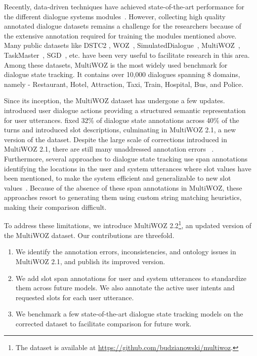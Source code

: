 Recently, data-driven techniques have achieved state-of-the-art performance for the different dialogue systems modules~\cite{Wen_2017, Ren_2018, zhang2019find,chao2019bert}. However, collecting high quality annotated dialogue datasets remains a challenge for the researchers because of the extensive annotation required for training the modules mentioned above. Many public datasets like DSTC2 \cite{henderson2014second}, WOZ~\cite{wen2017network}, SimulatedDialogue~\cite{shah2018building}, MultiWOZ~\cite{budzianowski2018multiwoz}, TaskMaster~\cite{byrne2019taskmaster}, SGD~\cite{rastogi2019scalable}, etc. have been very useful to facilitate research in this area. Among these datasets, MultiWOZ is the most widely used benchmark for dialogue state tracking. It contains over 10,000 dialogues spanning 8 domains, namely - Restaurant, Hotel, Attraction, Taxi, Train, Hospital, Bus, and Police. 

Since its inception, the MultiWOZ dataset has undergone a few updates. \citet{lee2019convlab} introduced user dialogue actions providing a structured semantic representation for user utterances. \citet{eric2019multiwoz} fixed 32\% of dialogue state annotations across 40\% of the turns and introduced slot descriptions, culminating in MultiWOZ 2.1, a new version of the dataset. Despite the large scale of corrections introduced in MultiWOZ 2.1, there are still many unaddressed annotation errors ~\cite{zhang2019find}. Furthermore, several approaches to dialogue state tracking use span annotations identifying the locations in the user and system utterances where slot values have been mentioned, to make the system efficient and generalizable to new slot values~\cite{rastogi2017scalable,WuTradeDST2019,zhang2019find,rastogi2019scalable, xu-hu-2018-end,zhou2019multidomain, Gao_2019}. Because of the absence of these span annotations in MultiWOZ, these approaches resort to generating them using custom string matching heuristics, making their comparison difficult. 

To address these limitations, we introduce MultiWOZ 2.2\footnote{The dataset is available at \url{https://github.com/budzianowski/multiwoz}.}, an updated version of the MultiWOZ dataset. Our contributions are threefold. 
\begin{enumerate}[leftmargin=*]
    \item We identify the annotation errors, inconsistencies, and ontology issues in MultiWOZ 2.1, and publish its improved version.
    \item We add slot span annotations for user and system utterances to standardize them across future models. We also annotate the active user intents and requested slots for each user utterance.
    \item We benchmark a few state-of-the-art dialogue state tracking models on the corrected dataset to facilitate comparison for future work.
\end{enumerate}


